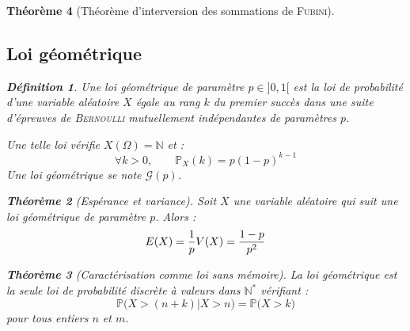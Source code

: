 \documentclass[11pt,a4paper]{report}
\newtheorem{theorem}{Théorème}[chapter]
\newtheorem{itheorem}[theorem]{Théorème}
\theoremstyle{definition}
\newtheorem{dfn}[theorem]{Définition}
\begin{document}
\begin{theorem}[Théorème d'interversion des sommations de \textsc{Fubini}]
{{\subsection{Loi géométrique}
\label{sub:loi_geometrique}
\begin{dfn}
     Une \emph{loi géométrique} de paramètre $p \in ]0, 1[$ est la loi de probabilité d'une variable aléatoire $X$ égale au rang $k$ du premier succès dans une suite d'épreuves de \textsc{Bernoulli} mutuellement indépendantes de paramètres $p$.\par
     Une telle loi vérifie $X(\Omega ) = \mathbb{N}$ et :
     \begin{equation}
     \forall k> 0,\qquad \mathbb{P}_X(k) = p (1-p)^{k-1}
     \end{equation}
     Une loi géométrique se note $\mathscr{G}(p)$.
\end{dfn}
\begin{theorem}[Espérance et variance]
     Soit $X$ une variable aléatoire qui suit une loi géométrique de paramètre $p$. Alors : 
     \begin{equation}
     E(X) = \dfrac{1}{p} \\ V(X) = \dfrac{1-p}{p^2}
     \end{equation}
\end{theorem}
\begin{itheorem}[Caractérisation comme loi sans mémoire]
     La loi géométrique est la seule loi de probabilité discrète à valeurs dans $\mathbb{N}^*$ vérifiant : 
     \begin{equation}
     \mathbb{P}\Big( X > (n+k) \Big| X > n \Big) = \mathbb{P} \big( X > k \big)
     \end{equation}
     pour tous entiers $n$ et $m$.
\end{itheorem}

}}
\end{theorem}
\end{document}
